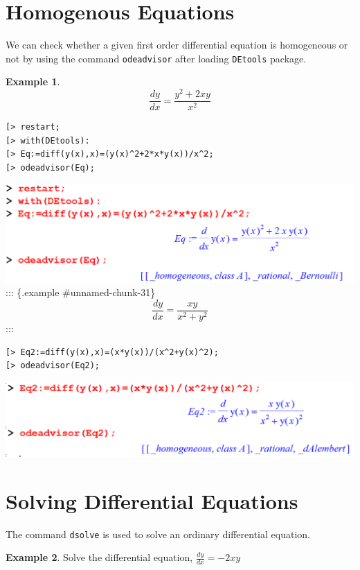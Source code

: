 \documentclass[
]{book}
\theoremstyle{definition}
\theoremstyle{definition}
\newtheorem{example}{Example}[chapter]
\theoremstyle{definition}
\theoremstyle{definition}
\theoremstyle{remark}
\begin{document}
\section{Homogenous Equations}\label{homogenous-equations}

We can check whether a given first order differential equation is homogeneous or not by using the command \texttt{odeadvisor} after loading \texttt{DEtools} package.

\begin{example}
\protect\hypertarget{exm:unnamed-chunk-30}{}\label{exm:unnamed-chunk-30}\[\frac{dy}{dx} = \frac{y^2+2xy}{x^2}\]
\end{example}

\begin{verbatim}
[> restart;
[> with(DEtools):
[> Eq:=diff(y(x),x)=(y(x)^2+2*x*y(x))/x^2;
[> odeadvisor(Eq);
\end{verbatim}

\includegraphics{figures/Diff/Diff 6.2 -4.png}
::: \{.example \#unnamed-chunk-31\}
\[\frac{dy}{dx} = \frac{xy}{x^2+y^2}\]
:::

\begin{verbatim}
[> Eq2:=diff(y(x),x)=(x*y(x))/(x^2+y(x)^2);
[> odeadvisor(Eq2);
\end{verbatim}

\includegraphics{figures/Diff/Diff 6.2 -5.png}

\section{Solving Differential Equations}\label{solving-differential-equations}

The command \texttt{dsolve} is used to solve an ordinary differential equation.

\begin{example}
\protect\hypertarget{exm:unnamed-chunk-32}{}\label{exm:unnamed-chunk-32}Solve the differential equation, \(\frac{dy}{dx} = -2xy\)
\end{example}
\end{document}
